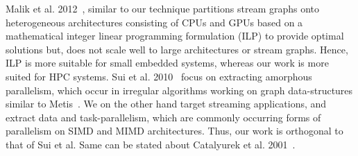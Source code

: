 Malik et al. 2012~\cite{Malik2012}, similar to our technique partitions stream
graphs onto heterogeneous architectures consisting of CPUs and GPUs based on a
mathematical integer linear programming formulation (ILP) to provide optimal
solutions but, does not scale well to large architectures or stream graphs.
Hence, ILP is more suitable for small
embedded systems, whereas our work is more suited for HPC systems. Sui et al.
2010~\cite{Sui:2010:PGP:1964536.1964553} focus on extracting amorphous
parallelism, which occur in irregular algorithms working on graph
data-structures similar to Metis~\cite{gkar95}. We on the other hand target
streaming applications, and extract data and task-parallelism, which are
commonly occurring forms of parallelism on SIMD and MIMD architectures. Thus,
our work is orthogonal to that of Sui et al. Same can be stated about Catalyurek
et al. 2001~\cite{Catalyurek:2001:HAC:582034.582062}.
